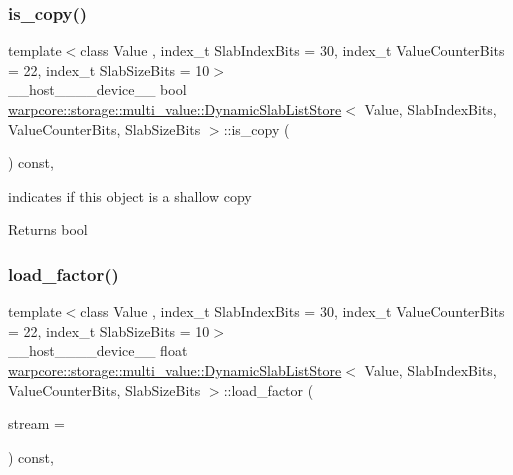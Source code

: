 \subsubsection{\texorpdfstring{is\+\_\+copy()}{is\_copy()}}
{\footnotesize\ttfamily template$<$class Value , index\+\_\+t Slab\+Index\+Bits = 30, index\+\_\+t Value\+Counter\+Bits = 22, index\+\_\+t Slab\+Size\+Bits = 10$>$ \\
\+\_\+\+\_\+host\+\_\+\+\_\+\+\_\+\+\_\+device\+\_\+\+\_\+ bool \hyperlink{classwarpcore_1_1storage_1_1multi__value_1_1DynamicSlabListStore}{warpcore\+::storage\+::multi\+\_\+value\+::\+Dynamic\+Slab\+List\+Store}$<$ Value, Slab\+Index\+Bits, Value\+Counter\+Bits, Slab\+Size\+Bits $>$\+::is\+\_\+copy (\begin{DoxyParamCaption}{ }\end{DoxyParamCaption}) const\hspace{0.3cm}{\ttfamily [inline]}, {\ttfamily [noexcept]}}



indicates if this object is a shallow copy 

\begin{DoxyReturn}{Returns}
{\ttfamily bool} 
\end{DoxyReturn}
\mbox{\label{classwarpcore_1_1storage_1_1multi__value_1_1DynamicSlabListStore_ab9e38febbac249da5662580311a76f06}} 
\subsubsection{\texorpdfstring{load\+\_\+factor()}{load\_factor()}}
{\footnotesize\ttfamily template$<$class Value , index\+\_\+t Slab\+Index\+Bits = 30, index\+\_\+t Value\+Counter\+Bits = 22, index\+\_\+t Slab\+Size\+Bits = 10$>$ \\
\+\_\+\+\_\+host\+\_\+\+\_\+\+\_\+\+\_\+device\+\_\+\+\_\+ float \hyperlink{classwarpcore_1_1storage_1_1multi__value_1_1DynamicSlabListStore}{warpcore\+::storage\+::multi\+\_\+value\+::\+Dynamic\+Slab\+List\+Store}$<$ Value, Slab\+Index\+Bits, Value\+Counter\+Bits, Slab\+Size\+Bits $>$\+::load\+\_\+factor (\begin{DoxyParamCaption}\item[{cuda\+Stream\+\_\+t}]{stream = {} }\end{DoxyParamCaption}) const\hspace{0.3cm}{\ttfamily [inline]}, {\ttfamily [noexcept]}}



